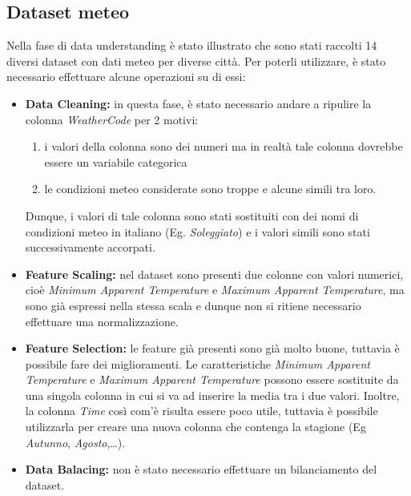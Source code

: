 \documentclass[a4paper, 11pt, oneside]{report}
\begin{document}
                \subsection{Dataset meteo}
                Nella fase di data understanding è stato illustrato che sono stati raccolti 14 diversi dataset con dati meteo per diverse città.
                Per poterli utilizzare, è stato necessario effettuare alcune operazioni su di essi:\\
                \begin{itemize}
                    \item \textbf{Data Cleaning:} in questa fase, è stato necessario andare a ripulire la colonna \emph{WeatherCode} per 2 motivi:
                        \begin{enumerate}
                            \item i valori della colonna sono dei numeri ma in realtà tale colonna dovrebbe essere un variabile categorica
                            \item le condizioni meteo considerate sono troppe e alcune simili tra loro.
                        \end{enumerate}
                    Dunque, i valori di tale colonna sono stati sostituiti con dei nomi di condizioni meteo in italiano (Eg.
                    \emph{Soleggiato}) e i valori simili sono stati successivamente accorpati.
                    \item \textbf{Feature Scaling:} nel dataset sono presenti due colonne con valori numerici, cioè
                    \emph{Minimum Apparent Temperature} e \emph{Maximum Apparent Temperature},
                    ma sono già espressi nella stessa scala e dunque non si ritiene necessario effettuare una normalizzazione.
                    \item \textbf{Feature Selection:} le feature già presenti sono già molto buone, tuttavia è possibile fare dei miglioramenti.
                    Le caratteristiche \emph{Minimum Apparent Temperature} e \emph{Maximum Apparent Temperature}
                    possono essere sostituite da una singola colonna in cui si va ad inserire la media tra i due valori.
                    Inoltre, la colonna \emph{Time} così com'è risulta essere poco utile, tuttavia è possibile utilizzarla per
                    creare una nuova colonna che contenga la stagione (Eg \emph{Autunno}, \emph{Agosto},\ldots).
                    \item \textbf{Data Balacing:} non è stato necessario effettuare un bilanciamento del dataset.
                \end{itemize}
\end{document}
